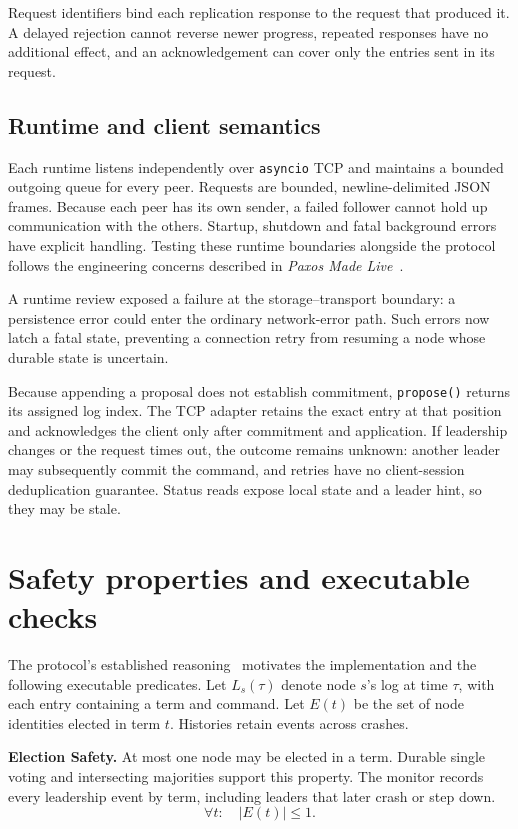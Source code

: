 \documentclass[10pt,a4paper]{article}
\begin{document}
Request identifiers bind each replication response to the request that produced
it. A delayed rejection cannot reverse newer progress, repeated responses have
no additional effect, and an acknowledgement can cover only the entries sent
in its request.

\subsection{Runtime and client semantics}
Each runtime listens independently over \texttt{asyncio} TCP and maintains a
bounded outgoing queue for every peer. Requests are bounded, newline-delimited
JSON frames. Because each peer has its own sender, a failed follower cannot hold
up communication with the others. Startup, shutdown and fatal background errors
have explicit handling. Testing these runtime boundaries alongside the protocol
follows the engineering concerns described in \emph{Paxos Made Live}~\cite{paxoslive}.

A runtime review exposed a failure at the storage--transport boundary: a
persistence error could enter the ordinary network-error path. Such errors now
latch a fatal state, preventing a connection retry from resuming a node whose
durable state is uncertain.

Because appending a proposal does not establish commitment, \texttt{propose()}
returns its assigned log index. The TCP adapter retains the exact entry at that
position and acknowledges the client only after commitment and application.
If leadership changes or the request times out, the outcome remains unknown:
another leader may subsequently commit the command, and retries have no
client-session deduplication guarantee. Status reads expose local state and a
leader hint, so they may be stale.

\section{Safety properties and executable checks}
The protocol's established reasoning~\cite{raft} motivates the implementation
and the following executable predicates. Let $L_s(\tau)$ denote node $s$'s log
at time $\tau$, with each entry containing a term and command. Let $E(t)$ be the
set of node identities elected in term $t$. Histories retain events across crashes.

\textbf{Election Safety.} At most one node may be elected in a term. Durable
single voting and intersecting majorities support this property. The monitor
records every leadership event by term, including leaders that later crash or
step down.
\begin{equation}
\forall t:\quad |E(t)| \leq 1.
\end{equation}
\end{document}
